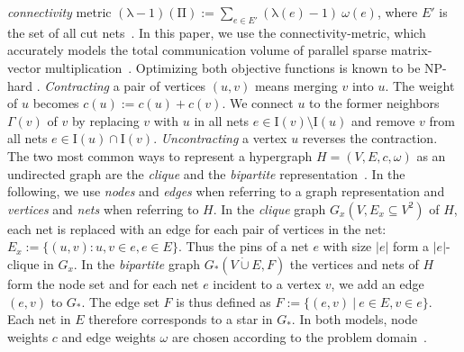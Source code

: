\emph{connectivity} metric $(\mathrm{\lambda} - 1)(\mathrm{\Pi}) := \sum_{e\in E'} (\mathrm{\lambda}(e) -1)~\omega(e)$, where $E'$ is the set of all cut nets~\cite{donath1988logic}.
In this paper, we use the connectivity-metric, which accurately models the total communication volume of parallel sparse matrix-vector multiplication~\cite{PaToH}.
Optimizing both objective functions is known to be NP-hard \cite{Lengauer:1990}.
\emph{Contracting} a pair of vertices $(u, v)$ means merging $v$ into $u$.
The weight of $u$ becomes $c(u) := c(u) + c(v)$.  We connect $u$ to the former neighbors $\Gamma(v)$ of $v$ by replacing 
$v$ with $u$ in all nets $e \in \mathrm{I}(v) \setminus \mathrm{I}(u)$ and remove $v$ from all nets $e \in \mathrm{I}(u) \cap \mathrm{I}(v)$.
\emph{Uncontracting} a vertex $u$ reverses the contraction.
The two most common ways to represent a hypergraph $H=(V,E,c,\omega)$ as an undirected graph are the \textit{clique} and the \textit{bipartite} representation~\cite{HuMoerder85}.
In the following, we use \emph{nodes} and \emph{edges} when referring to a graph representation and \emph{vertices}
and \emph{nets} when referring to $H$.
In the \textit{clique} graph $G_x(V,E_x \subseteq V^2)$ of $H$, each net is replaced with an edge for each
pair of vertices in the net: $E_x := \{(u,v) : u,v \in e, e \in E\}$. Thus the pins of a net $e$ with size $|e|$ form a $|e|$-clique in $G_x$.
In the \textit{bipartite} graph $G_*(V \dot\cup E, F)$ the vertices and nets of $H$ form the node set and for each net $e$ incident to a vertex $v$, we
add an edge $(e,v)$ to $G_*$. The edge set $F$ is thus defined as $F := \{(e,v)~|~e \in E, v \in e \}$. Each net in $E$ therefore corresponds to a star in $G_*$.
In both models, node weights $c$ and edge weights $\omega$ are chosen according to the problem domain~\cite{Hadley95}.
